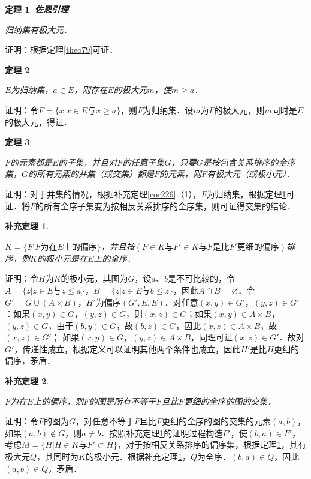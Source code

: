 \documentclass[12pt, a4paper, oneside]{book}
\newtheorem{theo}{定理}
\newtheorem{cor}{补充定理}
\begin{document}
			\begin{theo}\label{theo80}
				\textbf{佐恩引理}
				\par
				归纳集有极大元．
			\end{theo}
			证明：根据定理\ref{theo79}可证．

			\begin{theo}\label{theo81}
				\hfill\par
				$E$为归纳集，$a\in E$，则存在$E$的极大元$m$，使$m\geq a$．
			\end{theo}
			证明：令$F=\{x|x\in E\text{与}x\geq a\}$，则$F$为归纳集．设$m$为$F$的极大元，则$m$同时是$E$的极大元，得证．

			\begin{theo}\label{theo82}
				\hfill\par
				$F$的元素都是$E$的子集，并且对$F$的任意子集$G$，只要$G$是按包含关系排序的全序集，$G$的所有元素的并集（或交集）都是$F$的元素，则$F$有极大元（或极小元）．
			\end{theo}
			证明：对于并集的情况，根据补充定理\ref{cor226}（1），$F$为归纳集，根据定理\ref{theo80}可证．将$F$的所有全序子集变为按相反关系排序的全序集，则可证得交集的结论．
			
			\begin{cor}\label{cor227}
				\hfill\par
				$K=\{F|F\text{为在}E\text{上的偏序}\}$，并且按$(F\in K\text{与}F'\in K\text{与}F\text{是比}F'\text{更细的偏序})$排序，则$K$的极小元是在$E$上的全序．
			\end{cor}
			证明：令$H$为$K$的极小元，其图为$G$，设$a$、$b$是不可比较的，令$A=\{z|z\in E\text{与}z\leq a\}$，$B=\{z|z\in E\text{与}b\leq z\}$，因此$A\cap B=\varnothing$．令$G'=G\cup(A\times B)$，$H'$为偏序$(G', E, E)$．对任意$(x, y)\in G'$，$(y, z)\in G'$：如果$(x, y)\in G$，$(y, z)\in G$，则$(x, z)\in G$；如果$(x, y)\in A\times B$，$(y, z)\in G$，由于$(b, y)\in G$，故$(b, z)\in G$，因此$(x, z)\in A\times B$，故$(x, z)\in G'$； 如果$(x, y)\in G$，$(y, z)\in A\times B$，同理可证$(x, z)\in G'$．故对$G'$，传递性成立，根据定义可以证明其他两个条件也成立，因此$H'$是比$H$更细的偏序，矛盾．
			
			\begin{cor}\label{cor228}
				\hfill\par
				$F$为在$E$上的偏序，则$F$的图是所有不等于$F$且比$F$更细的全序的图的交集．
			\end{cor}
			证明：令$F$的图为$G$，对任意不等于$F$且比$F$更细的全序的图的交集的元素$(a, b)$，如果$(a, b)\notin G$，则$a\neq b$．按照补充定理\ref{cor227}的证明过程构造$F'$，使$(b, a)\in F'$，考虑$M=\{H|H\in K\text{与}F'\subset H\}$，对于按相反关系排序的偏序集，根据定理\ref{theo80}，其有极大元$Q$，其同时为$K$的极小元．根据补充定理\ref{cor227}，$Q$为全序．$(b, a)\in Q$，因此$(a, b)\in Q$，矛盾．
			
\end{document}
